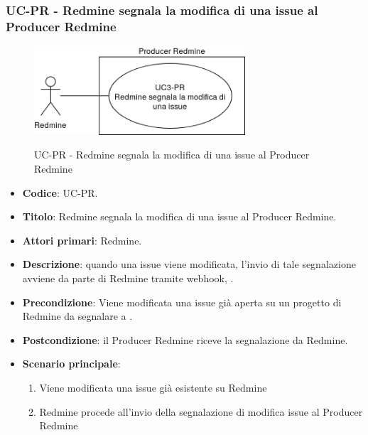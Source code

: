 	\subsubsection{UC\theuccount-PR - Redmine segnala la modifica di una issue al Producer Redmine}
	\begin{figure}[H]
		\centering
		\includegraphics[width=0.7\textwidth]{img/casi_d'uso/UC3.png}\\
		\caption{UC\theuccount-PR - Redmine segnala la modifica di una issue al Producer Redmine}
	\end{figure}
	\begin{itemize}
		\item \textbf{Codice}: UC\theuccount-PR.
		\item \textbf{Titolo}: Redmine segnala la modifica di una issue al Producer Redmine.
		\item \textbf{Attori primari}: Redmine.
		\item \textbf{Descrizione}: quando una issue viene modificata, l'invio di tale segnalazione avviene da parte di Redmine tramite webhook, .
		\item \textbf{Precondizione}: Viene modificata una issue già aperta su un
		progetto di Redmine da segnalare a \progetto.
		\item \textbf{Postcondizione}: il Producer Redmine riceve la segnalazione da Redmine.
		\item \textbf{Scenario principale}: 
		\begin{enumerate}
			\item Viene modificata una issue già esistente su Redmine
			\item Redmine procede all'invio della segnalazione di modifica issue al Producer Redmine
		\end{enumerate}
		
	\end{itemize}